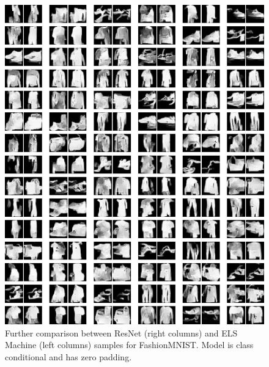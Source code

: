 \documentclass{article}
\theoremstyle{plain}
\theoremstyle{definition}
\theoremstyle{remark}
\begin{document}
\begin{figure}
    \centering
    \includegraphics[width=0.9\linewidth]{fashion_mnist_zeros_samps_resnet_m.png}
    \caption{Further comparison between ResNet (right columns) and ELS Machine (left columns) samples for FashionMNIST. Model is class conditional and has zero padding.}
\end{figure}
\end{document}
